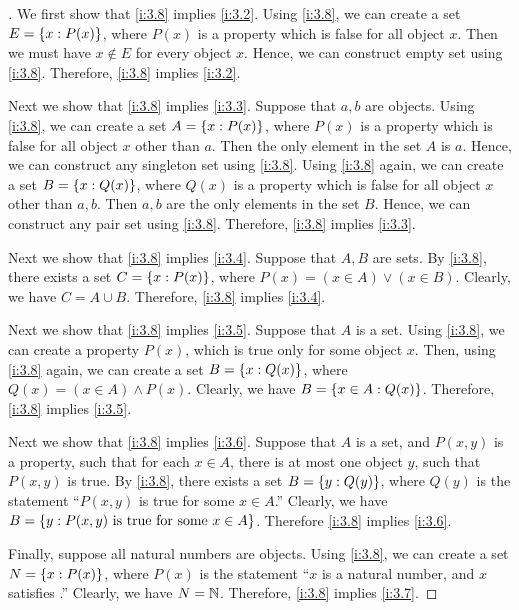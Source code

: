 \begin{proof}[]
  We first show that \cref{i:3.8} implies \cref{i:3.2}.
  Using \cref{i:3.8}, we can create a set \(E = \left\lbrace x : P(x)\right\rbrace\), where \(P(x)\) is a property which is false for all object \(x\).
  Then we must have \(x \notin E\) for every object \(x\).
  Hence, we can construct empty set using \cref{i:3.8}.
  Therefore, \cref{i:3.8} implies \cref{i:3.2}.

  Next we show that \cref{i:3.8} implies \cref{i:3.3}.
  Suppose that \(a, b\) are objects.
  Using \cref{i:3.8}, we can create a set \(A = \left\lbrace x : P(x)\right\rbrace\), where \(P(x)\) is a property which is false for all object \(x\) other than \(a\).
  Then the only element in the set \(A\) is \(a\).
  Hence, we can construct any singleton set using \cref{i:3.8}.
  Using \cref{i:3.8} again, we can create a set \(B = \left\lbrace x : Q(x)\right\rbrace\), where \(Q(x)\) is a property which is false for all object \(x\) other than \(a, b\).
  Then \(a, b\) are the only elements in the set \(B\).
  Hence, we can construct any pair set using \cref{i:3.8}.
  Therefore, \cref{i:3.8} implies \cref{i:3.3}.

  Next we show that \cref{i:3.8} implies \cref{i:3.4}.
  Suppose that \(A, B\) are sets.
  By \cref{i:3.8}, there exists a set \(C = \left\lbrace x : P(x)\right\rbrace\), where \(P(x) = (x \in A) \lor (x \in B)\).
  Clearly, we have \(C = A \cup B\).
  Therefore, \cref{i:3.8} implies \cref{i:3.4}.

  Next we show that \cref{i:3.8} implies \cref{i:3.5}.
  Suppose that \(A\) is a set.
  Using \cref{i:3.8}, we can create a property \(P(x)\), which is true only for some object \(x\).
  Then, using \cref{i:3.8} again, we can create a set \(B = \left\lbrace x : Q(x)\right\rbrace\), where \(Q(x) = (x \in A) \land P(x)\).
  Clearly, we have \(B = \left\lbrace x \in A : Q(x)\right\rbrace\).
  Therefore, \cref{i:3.8} implies \cref{i:3.5}.

  Next we show that \cref{i:3.8} implies \cref{i:3.6}.
  Suppose that \(A\) is a set, and \(P(x, y)\) is a property, such that for each \(x \in A\), there is at most one object \(y\), such that \(P(x, y)\) is true.
  By \cref{i:3.8}, there exists a set \(B = \left\lbrace y : Q(y)\right\rbrace\), where \(Q(y)\) is the statement ``\(P(x, y)\) is true for some \(x \in A\).''
  Clearly, we have \(B = \left\lbrace y : P(x, y) \text{ is true for some } x \in A\right\rbrace\).
  Therefore \cref{i:3.8} implies \cref{i:3.6}.

  Finally, suppose all natural numbers are objects.
  Using \cref{i:3.8}, we can create a set \(N = \left\lbrace x : P(x)\right\rbrace\), where \(P(x)\) is the statement ``\(x\) is a natural number, and \(x\) satisfies .''
  Clearly, we have \(N = \mathbb{N}\).
  Therefore, \cref{i:3.8} implies \cref{i:3.7}.
\end{proof}

